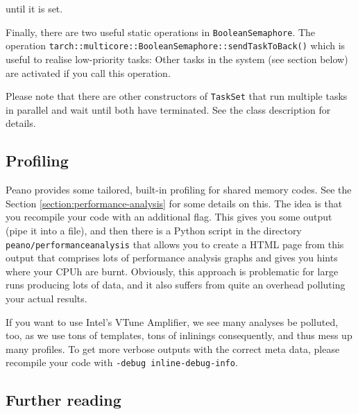 \noindent
until it is set.

Finally, there are two useful static operations in \texttt{BooleanSemaphore}.
The operation \linebreak
\texttt{tarch::multicore::BooleanSemaphore::sendTaskToBack()}
which is useful to realise \linebreak low-\-priority tasks: Other tasks in the
system (see section below) are activated if you call this operation.


Please note that there are other constructors of \texttt{TaskSet} that run
multiple tasks in parallel and wait until both have terminated. 
See the class description for details.



\subsection{Profiling}

Peano provides some tailored, built-in profiling for shared memory codes. 
See the Section \ref{section:performance-analysis} for some details on this. 
The idea is that you recompile your code with an additional flag.
This gives you some output (pipe it into a file), and then there is a Python
script in the directory \texttt{peano/performanceanalysis} that allows you to
create a HTML page from this output that comprises lots of performance analysis
graphs and gives you hints where your CPUh are burnt. Obviously, this approach
is problematic for large runs producing lots of data, and it also suffers from
quite an overhead polluting your actual results.

If you want to use Intel's VTune Amplifier, we see many analyses be polluted,
too, as we use tons of templates, tons of inlinings consequently, and thus mess
up many profiles. To get more verbose outputs with the correct meta data, please
recompile your code with \texttt{-debug inline-debug-info}.


\subsection*{Further reading}

